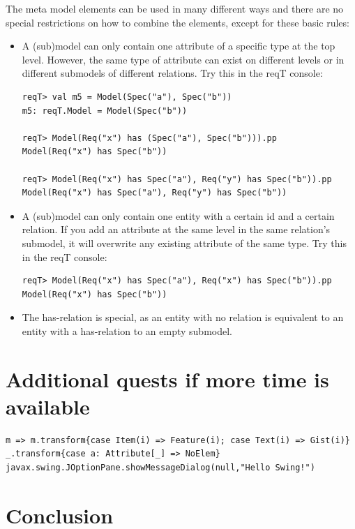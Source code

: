\documentclass[11pt]{article}
\begin{document}
The meta model elements can be used in many different ways and there are no special restrictions on how to combine the elements, except for these basic rules:
\begin{itemize}
\item A (sub)model can only contain one attribute of a specific type at the top level. However, the same type of attribute can exist on different levels or in different submodels of different relations. Try this in the reqT console:
{\footnotesize\begin{verbatim}
reqT> val m5 = Model(Spec("a"), Spec("b"))
m5: reqT.Model = Model(Spec("b"))

reqT> Model(Req("x") has (Spec("a"), Spec("b"))).pp
Model(Req("x") has Spec("b"))

reqT> Model(Req("x") has Spec("a"), Req("y") has Spec("b")).pp
Model(Req("x") has Spec("a"), Req("y") has Spec("b"))
\end{verbatim}}
\item A (sub)model can only contain one entity with a certain id and a certain relation. If you add an attribute at the same level in the same relation's submodel, it will overwrite any existing attribute of the same type. Try this in the reqT console:
{\footnotesize\begin{verbatim}
reqT> Model(Req("x") has Spec("a"), Req("x") has Spec("b")).pp
Model(Req("x") has Spec("b"))
\end{verbatim}}

\item The has-relation is special, as an entity with no relation is equivalent to an entity with a has-relation to an empty submodel.
\end{itemize}

\section{Additional quests if more time is available}

{\footnotesize\begin{verbatim}
m => m.transform{case Item(i) => Feature(i); case Text(i) => Gist(i)}
_.transform{case a: Attribute[_] => NoElem}
javax.swing.JOptionPane.showMessageDialog(null,"Hello Swing!")
\end{verbatim}}

\section{Conclusion}
\end{document}
